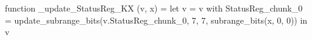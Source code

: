 function _update_StatusReg_KX (v, x) = let v = { v with StatusReg_chunk_0 = update_subrange_bits(v.StatusReg_chunk_0, 7, 7, subrange_bits(x, 0, 0)) } in
  v
